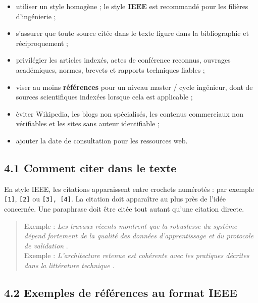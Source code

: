 \begin{itemize}[leftmargin=1.2cm]
\item utiliser un style homog\`ene ; le style \textbf{IEEE} est recommand\'e pour les fili\`eres d'ing\'enierie ;
\item s'assurer que toute source cit\'ee dans le texte figure dans la bibliographie et r\'eciproquement ;
\item privil\'egier les articles index\'es, actes de conf\'erence reconnus, ouvrages acad\'emiques, normes, brevets et rapports techniques fiables ;
\item viser au moins \textbf{\MinReferences{} r\'ef\'erences} pour un niveau master / cycle ing\'enieur, dont \IndexedRatio{} de sources scientifiques index\'ees lorsque cela est applicable ;
\item \`eviter Wikipedia, les blogs non sp\'ecialis\'es, les contenus commerciaux non v\'erifiables et les sites sans auteur identifiable ;
\item ajouter la date de consultation pour les ressources web.
\end{itemize}

\subsection*{4.1 Comment citer dans le texte}

En style IEEE, les citations apparaissent entre crochets num\'erot\'es : par exemple \texttt{[1]}, \texttt{[2]} ou \texttt{[3], [4]}. La citation doit appara\^itre au plus pr\`es de l'id\'ee concern\'ee. Une paraphrase doit \^etre cit\'ee tout autant qu'une citation directe.

\begin{quote}
Exemple : \textit{Les travaux r\'ecents montrent que la robustesse du syst\`eme d\'epend fortement de la qualit\'e des donn\'ees d'apprentissage et du protocole de validation} \cite{example_journal_2024}. \\
Exemple : \textit{L'architecture retenue est coh\'erente avec les pratiques d\'ecrites dans la litt\'erature technique} \cite{example_conference_2023,example_standard}.
\end{quote}

\subsection*{4.2 Exemples de r\'ef\'erences au format IEEE}

